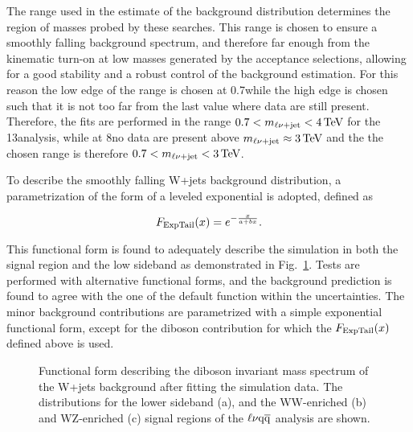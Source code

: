 The \mlvj range used in the estimate of the background distribution determines the region of masses probed by these searches.
This range is chosen to ensure a smoothly falling background spectrum, and therefore far enough from the kinematic turn-on at low masses generated by the acceptance selections,
allowing for a good stability and a robust control of the background estimation.
For this reason the low edge of the range is chosen at 0.7\TeV while the high edge is chosen such that it is not too far from the last value where data are still present.
Therefore, the fits are performed in the range $0.7 < m_{\ell\nu+{\rm jet}} < 4\,\text{Te\hspace{-.08em}V}$ for the 13\TeV analysis, while at 8\TeV no data are present above $m_{\ell\nu+{\rm jet}} \approx 3\,\text{Te\hspace{-.08em}V}$ and the the chosen range is therefore $0.7 < m_{\ell\nu+{\rm jet}} < 3\,\text{Te\hspace{-.08em}V}$.

To describe the smoothly falling W+jets background distribution, a parametrization of the form of a leveled exponential is adopted, defined as

\begin{equation}\label{eqn:mVVfunct}
   F_{\rm ExpTail}(x) = e^{-\frac{x}{a+bx}}.
\end{equation}

This functional form is found to adequately describe the simulation in both the signal region and the low sideband as demonstrated in Fig.~\ref{fig:mcfits_mlvj}. Tests are performed with alternative functional forms, and the background prediction is found to agree with the one of the default function within the uncertainties.
The minor background contributions are parametrized with a simple exponential functional form, except for the diboson contribution for which the $F_{\rm ExpTail}(x)$ defined above is used.

\begin{figure}[!htb]
\centering
{}
\caption{Functional form describing the diboson invariant mass spectrum of the W+jets background after fitting the simulation data. The distributions for the lower \mJ sideband (a), and the WW-enriched (b) and WZ-enriched (c) signal regions of the $\ell\nu\mathrm{q}\overline{\mathrm{q}}$ analysis are shown.}
\label{fig:mcfits_mlvj}
\end{figure}

